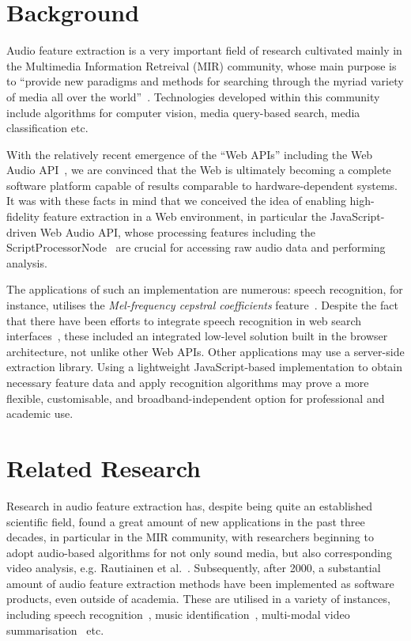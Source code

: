 \documentclass{sig-alternate}
\begin{document}
\section{Background}

Audio feature extraction is a very important field of research cultivated mainly in the Multimedia Information Retreival (MIR) community, whose main purpose is to ``provide new paradigms and methods for searching through the myriad variety of media all over the world''~\cite{lew2006}. Technologies developed within this community include algorithms for computer vision, media query-based search, media classification etc.

With the relatively recent emergence of the ``Web APIs'' including the Web Audio API~\cite{webaudiospec}, we are convinced that the Web is ultimately becoming a complete software platform capable of results comparable to hardware-dependent systems. It was with these facts in mind that we conceived the idea of enabling high-fidelity feature extraction in a Web environment, in particular the JavaScript-driven Web Audio API, whose processing features including the \mbox{ScriptProcessorNode}~\cite{webaudiospec} are crucial for accessing raw audio data and performing analysis.

The applications of such an implementation are numerous: speech recognition, for instance, utilises the \emph{Mel-frequency cepstral coefficients} feature~\cite{ganchev2005}. Despite the fact that there have been efforts to integrate speech recognition in web search interfaces~\cite{webspeechapispec}, these included an integrated low-level solution built in the browser architecture, not unlike other Web APIs. Other applications may use a server-side extraction library. Using a lightweight JavaScript-based implementation to obtain necessary feature data and apply recognition algorithms may prove a more flexible, customisable, and broadband-independent option for professional and academic use.

\section{Related Research}

Research in audio feature extraction has, despite being quite an established scientific field, found a great amount of new applications in the past three decades, in particular in the MIR community, with researchers beginning to adopt audio-based algorithms for not only sound media, but also corresponding video analysis, e.g. Rautiainen et al.~\cite{rautiainen2003}. Subsequently, after 2000, a substantial amount of audio feature extraction methods have been implemented as software products, even outside of academia. These are utilised in a variety of instances, including speech recognition~\cite{oshaughnessy2008}, music identification~\cite{wang2006}, multi-modal video summarisation~\cite{pan2004} etc.
\end{document}
